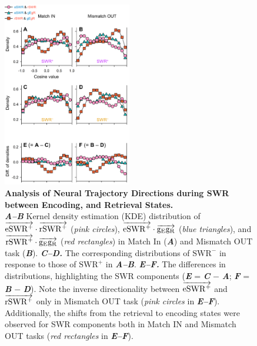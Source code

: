 \documentclass[final,3p,times,twocolumn]{elsarticle}
\begin{document}
        \clearpage
        \begin{figure}[ht]
        	\centering
            \includegraphics[width=0.5\textwidth]{./media/figures/.png/Figure_ID_07.png}
        	\caption{\textbf{
Analysis of Neural Trajectory Directions during SWR between Encoding, and Retrieval States.
}
\smallskip
\\
\textbf{\textit{A--B}} Kernel density estimation (KDE) distribution of $\protect\overrightarrow{{\mathrm{eSWR^+}}} \cdot \protect\overrightarrow{{\mathrm{rSWR^+}}}$ (\textit{pink circles}), $\protect\overrightarrow{{\mathrm{eSWR^+}}} \cdot \protect\overrightarrow{{\mathrm{g_{E}g_{R}}}}$ (\textit{blue triangles}), and $\protect\overrightarrow{{\mathrm{rSWR^+}}} \cdot \protect\overrightarrow{{\mathrm{g_{E}g_{R}}}}$ (\textit{red rectangles}) in Match In (\textbf{\textit{A}}) and Mismatch OUT task (\textbf{\textit{B}}). \textbf{\textit{C--D.}} The corresponding distributions of $\mathrm{SWR^-}$ in response to those of $\mathrm{SWR^+}$ in \textbf{\textit{A--B}}. \textbf{\textit{E--F.}} The differences in distributions, highlighting the SWR components (\textbf{\textit{E}} = \textbf{\textit{C}} $-$ \textbf{\textit{A}}; \textbf{\textit{F}} = \textbf{\textit{B}} $-$ \textbf{\textit{D}}). Note the inverse directionality between $\protect\overrightarrow{{\mathrm{eSWR^+}}}$ and $\protect\overrightarrow{{\mathrm{rSWR^+}}}$ only in Mismatch OUT task (\textit{pink circles} in \textbf{\textit{E--F}}). Additionally, the shifts from the retrieval to encoding states were observed for SWR components both in Match IN and Mismatch OUT tasks (\textit{red rectangles} in \textbf{\textit{E--F}}).
}
        	\label{fig:07}
        \end{figure}
\end{document}
